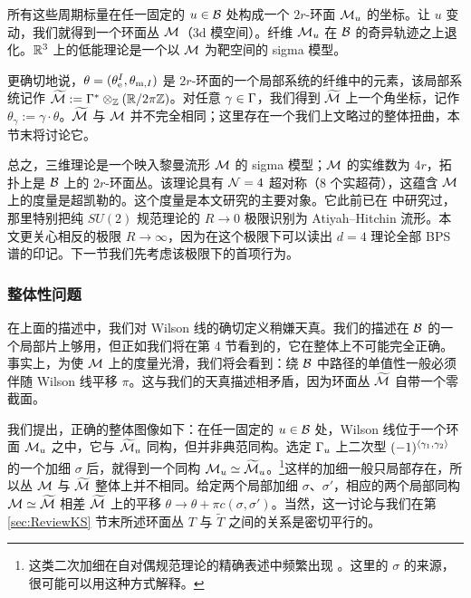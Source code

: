 所有这些周期标量在任一固定的 $u \in \mathcal{B}$ 处构成一个 $2r$-环面 $\mathcal{M}_u$ 的坐标。让 $u$ 变动，我们就得到一个环面丛 $\mathcal{M}$（3d 模空间）。纤维 $\mathcal{M}_u$ 在 $\mathcal{B}$ 的奇异轨迹之上退化。$\mathbb{R}^3$ 上的低能理论是一个以 $\mathcal{M}$ 为靶空间的 sigma 模型。

更确切地说，$\theta = (\theta_{\mathrm{e}}^I, \theta_{\mathrm{m},I})$ 是 $2r$-环面的一个局部系统的纤维中的元素，该局部系统记作 $\widetilde{\mathcal{M}} := \Gamma^*\otimes_{\mathbb{Z}} (\mathbb{R}/2\pi \mathbb{Z})$。对任意 $\gamma \in \Gamma$，我们得到 $\widetilde{\mathcal{M}}$ 上一个角坐标，记作 $\theta_\gamma := \gamma \cdot \theta$。$\widetilde{\mathcal{M}}$ 与 $\mathcal{M}$ 并不完全相同；这里存在一个我们上文略过的整体扭曲，本节末将讨论它。

总之，三维理论是一个映入黎曼流形 $\mathcal{M}$ 的 sigma 模型；$\mathcal{M}$ 的实维数为 $4r$，拓扑上是 $\mathcal{B}$ 上的 $2r$-环面丛。该理论具有 $\mathcal{N}=4$ 超对称（$8$ 个实超荷），这蕴含 $\mathcal{M}$ 上的度量是超凯勒的。这个度量是本文研究的主要对象。它此前已在 \cite{Seiberg:1996nz} 中研究过，那里特别把纯 $SU(2)$ 规范理论的 $R \to 0$ 极限识别为 Atiyah--Hitchin 流形。本文更关心相反的极限 $R \to \infty$，因为在这个极限下可以读出 $d=4$ 理论全部 BPS 谱的印记。下一节我们先考虑该极限下的首项行为。

\subsubsection*{整体性问题}

在上面的描述中，我们对 Wilson 线的确切定义稍嫌天真。我们的描述在 $\mathcal{B}$ 的一个局部片上够用，但正如我们将在第 4 节看到的，它在整体上不可能完全正确。%
事实上，为使 $\mathcal{M}$ 上的度量光滑，我们将会看到：绕 $\mathcal{B}$ 中路径的单值性一般必须伴随 Wilson 线平移 $\pi$。这与我们的天真描述相矛盾，因为环面丛 $\widetilde{\mathcal{M}}$ 自带一个零截面。

我们提出，正确的整体图像如下：在任一固定的 $u \in \mathcal{B}$ 处，Wilson 线位于一个环面 $\mathcal{M}_u$ 之中，它与 $\widetilde{\mathcal{M}}_u$ 同构，但并非典范同构。选定 $\Gamma_u$ 上二次型 $(-1)^{\langle \gamma_1,\gamma_2 \rangle}$ 的一个加细 $\sigma$ 后，就得到一个同构 $\mathcal{M}_u \simeq \widetilde{\mathcal{M}}_u$。\footnote{这类二次加细在自对偶规范理论的精确表述中频繁出现 \cite{Witten:1996hc,Freed:2000ta,Hopkins:2002rd,Belov:2006jd}。这里的 $\sigma$ 的来源，很可能可以用这种方式解释。}这样的加细一般只局部存在，所以丛 $\mathcal{M}$ 与 $\widetilde{\mathcal{M}}$ 整体上并不相同。给定两个局部加细 $\sigma$、$\sigma'$，相应的两个局部同构 $\mathcal{M} \simeq \widetilde{\mathcal{M}}$ 相差 $\widetilde{\mathcal{M}}$ 上的平移 $\theta \to \theta + \pi c(\sigma,\sigma')$。当然，这一讨论与我们在第 \ref{sec:ReviewKS} 节末所述环面丛 $T$ 与 $\tilde{T}$ 之间的关系是密切平行的。

